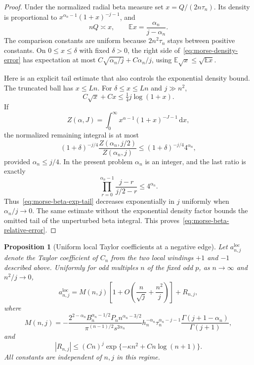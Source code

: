 \documentclass[11pt]{article}
\numberwithin{equation}{section}
\newtheorem{proposition}[theorem]{Proposition}
\theoremstyle{definition}
\newcommand{\dd}{\,\mathrm d}
\begin{document}
\begin{proof}
Under the normalized radial beta measure set
$x=Q/(2n\tau_n)$.  Its density is proportional to
$x^{\alpha_n-1}(1+x)^{-j-1}$, and
\[
 nQ\asymp x,\qquad
 \mathbb E x=\frac{\alpha_n}{j-\alpha_n}.
\]
The comparison constants are uniform because $2n^2\tau_n$ stays
between positive constants.  On $0\le x\le\delta$ with fixed
$\delta>0$, the right side of~\eqref{eq:morse-density-error} has
expectation at most
$C\sqrt{\alpha_n/j}+C\alpha_n/j$, using
$\mathbb E\sqrt x\le\sqrt{\mathbb E x}$.

Here is an explicit tail estimate that also controls the exponential
density bound.  The truncated ball has $x\le Ln$.  For
$\delta\le x\le Ln$ and $j\gg n^2$,
\[
 C\sqrt x+Cx\le\tfrac14j\log(1+x).
\]
If
\[
 Z(\alpha,J)=\int_0^\infty x^{\alpha-1}(1+x)^{-J-1}\dd x,
\]
the normalized remaining integral is at most
\begin{equation}
 (1+\delta)^{-j/4}\frac{Z(\alpha_n,j/2)}{Z(\alpha_n,j)}
 \le (1+\delta)^{-j/4}4^{\alpha_n},
 \label{eq:morse-beta-exp-tail}
\end{equation}
provided $\alpha_n\le j/4$.  In the present problem $\alpha_n$ is
an integer, and the last ratio is exactly
\[
 \prod_{r=0}^{\alpha_n-1}\frac{j-r}{j/2-r}\le4^{\alpha_n}.
\]
Thus~\eqref{eq:morse-beta-exp-tail} decreases exponentially in $j$
uniformly when $\alpha_n/j\to0$.  The same estimate without the
exponential density factor bounds the omitted tail of the unperturbed
beta integral.  This proves~\eqref{eq:morse-beta-relative-error}.
\end{proof}

\begin{proposition}[Uniform local Taylor coefficients at a negative edge]
\label{prop:negative-local-jets}
Let $a^{\mathrm{loc}}_{n,j}$ denote the Taylor coefficient of $C_n$
from the two local windings $+1$ and $-1$ described above.  Uniformly
for odd multiples $n$ of the fixed odd $p$, as $n\to\infty$ and
$n^2/j\to0$,
\begin{equation}
 a^{\mathrm{loc}}_{n,j}
 =M(n,j)\left[1+O\left(\frac n{\sqrt j}+\frac{n^2}{j}\right)\right]
 +R_{n,j},
 \label{eq:morse-final-relative}
\end{equation}
where
\begin{equation}
 \boxed{\displaystyle
 M(n,j)=
 -\frac{2^{2-\alpha_n}B_n^{\alpha_n-1/2}P_n n^{\alpha_n-3/2}}
 {\pi^{(n-1)/2}s^{2\alpha_n}}
 h_n^{-\alpha_n}\tau_n^{\alpha_n-j-1}
 \frac{\Gamma(j+1-\alpha_n)}{\Gamma(j+1)},}
 \label{eq:morse-model}
\end{equation}
and
\begin{equation}
 |R_{n,j}|\le (Cn)^j
 \exp\{-\kappa n^2+C n\log(n+1)\}.
 \label{eq:morse-final-remainder}
\end{equation}
All constants are independent of $n,j$ in this regime.
\end{proposition}
\end{document}
